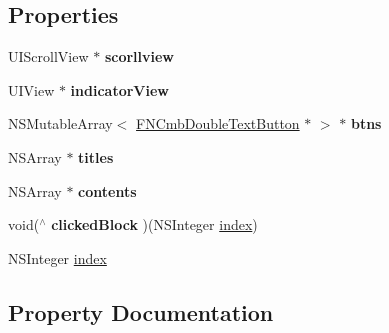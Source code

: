\subsection*{Properties}
\begin{DoxyCompactItemize}
\item 
\mbox{\label{interface_f_n_mine_promote_cate_view_ad83cc088448b88f721f9ac6db5642ffc}} 
U\+I\+Scroll\+View $\ast$ {\bfseries scorllview}
\item 
\mbox{\label{interface_f_n_mine_promote_cate_view_af563a94cd382b01b9230a3e5a02a1974}} 
U\+I\+View $\ast$ {\bfseries indicator\+View}
\item 
\mbox{\label{interface_f_n_mine_promote_cate_view_a3b75833facb3ee2ac8e80930e7989fef}} 
N\+S\+Mutable\+Array$<$ \mbox{\hyperlink{interface_f_n_cmb_double_text_button}{F\+N\+Cmb\+Double\+Text\+Button}} $\ast$ $>$ $\ast$ {\bfseries btns}
\item 
\mbox{\label{interface_f_n_mine_promote_cate_view_af279b517ce48bf68767fc0b67fe53b8e}} 
N\+S\+Array $\ast$ {\bfseries titles}
\item 
\mbox{\label{interface_f_n_mine_promote_cate_view_af61f4936f5bf9d667eb811431f424c95}} 
N\+S\+Array $\ast$ {\bfseries contents}
\item 
\mbox{\label{interface_f_n_mine_promote_cate_view_a57ffd81e85ee5db180570e1337b3ba42}} 
void($^\wedge$ {\bfseries clicked\+Block} )(N\+S\+Integer \mbox{\hyperlink{interface_f_n_mine_promote_cate_view_a845edc5612f5985c51006643a618aeba}{index}})
\item 
N\+S\+Integer \mbox{\hyperlink{interface_f_n_mine_promote_cate_view_a845edc5612f5985c51006643a618aeba}{index}}
\end{DoxyCompactItemize}


\subsection{Property Documentation}
\mbox{\label{interface_f_n_mine_promote_cate_view_a845edc5612f5985c51006643a618aeba}} 
